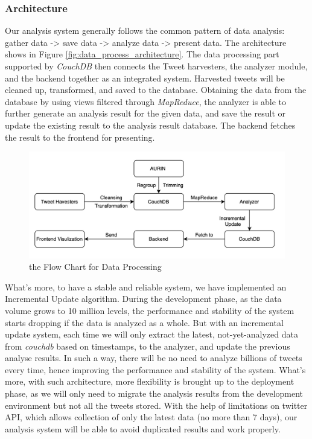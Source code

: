 \documentclass{article}
\begin{document}
\subsubsection{Architecture}
Our analysis system generally follows the common pattern of data analysis: gather data -> save data -> analyze data -> present data. The architecture shows in Figure
\ref{fig:data_process_architecture}. The data processing part supported by \textit{CouchDB} then connects the Tweet harvesters, the analyzer module, and the backend together as an integrated system. Harvested tweets will be cleaned up, transformed, and saved to the database. Obtaining the data from the database by using views filtered through \textit{MapReduce}, the analyzer is able to further generate an analysis result for the given data, and save the result or update the existing result to the analysis result database. The backend fetches the result to the frontend for presenting.
\begin{figure}[htp]
\centering
\includegraphics[width=\textwidth]{img/3_2_1_data_processing.jpg}
\caption{the Flow Chart for Data Processing}
\label{fig:fig:data_process_architecture}
\end{figure}

What’s more, to have a stable and reliable system, we have implemented an Incremental Update algorithm. During the development phase, as the data volume grows to 10 million levels, the performance and stability of the system starts dropping if the data is analyzed as a whole. But with an incremental update system, each time we will only extract the latest, not-yet-analyzed data from \textit{couchdb} based on timestamps, to the analyzer, and update the previous analyse results. In such a way, there will be no need to analyze billions of tweets every time, hence improving the performance and stability of the system. What’s more, with such architecture, more flexibility is brought up to the deployment phase, as we will only need to migrate the analysis results from the development environment but not all the tweets stored. With the help of limitations on twitter API, which allows collection of only the latest data (no more than 7 days), our analysis system will be able to avoid duplicated results and work properly.
\end{document}
